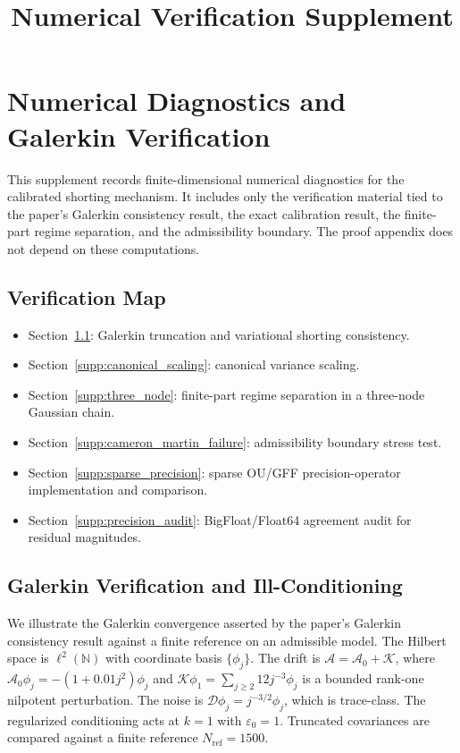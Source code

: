 \documentclass[11pt]{article}
\title{Numerical Verification Supplement}
\author{}
\date{}
\begin{document}
\maketitle

\section{Numerical Diagnostics and Galerkin Verification}
\label{supp:numerical}

This supplement records finite-dimensional numerical diagnostics for the
calibrated shorting mechanism. It includes only the verification material tied
to the paper's Galerkin consistency result, the exact calibration result, the
finite-part regime separation, and the admissibility boundary. The proof
appendix does not depend on these computations.

\subsection*{Verification Map}
\label{supp:verification_map}

\begin{itemize}[leftmargin=*]
    \item Section~\ref{supp:galerkin_verification}: Galerkin truncation and
    variational shorting consistency.
    \item Section~\ref{supp:canonical_scaling}: canonical variance scaling.
    \item Section~\ref{supp:three_node}: finite-part regime separation in a
    three-node Gaussian chain.
    \item Section~\ref{supp:cameron_martin_failure}: admissibility boundary
    stress test.
    \item Section~\ref{supp:sparse_precision}: sparse OU/GFF precision-operator
    implementation and comparison.
    \item Section~\ref{supp:precision_audit}: BigFloat/Float64 agreement audit
    for residual magnitudes.
\end{itemize}

\subsection{Galerkin Verification and Ill-Conditioning}
\label{supp:galerkin_verification}

We illustrate the Galerkin convergence asserted by the paper's Galerkin
consistency result against a finite reference on an admissible model. The
Hilbert space is $\ell^2(\mathbb{N})$ with coordinate basis $\{\phi_j\}$. The
drift is $\mathcal{A}=\mathcal{A}_0+\mathcal{K}$, where
$\mathcal{A}_0\phi_j=-(1+0.01j^2)\phi_j$ and
$\mathcal{K}\phi_1=\sum_{j\ge2}12j^{-3}\phi_j$ is a bounded rank-one nilpotent
perturbation. The noise is $\mathcal{D}\phi_j=j^{-3/2}\phi_j$, which is
trace-class. The regularized conditioning acts at $k=1$ with
$\varepsilon_0=1$. Truncated covariances are compared against a finite
reference $N_{\mathrm{ref}}=1500$.
\end{document}
